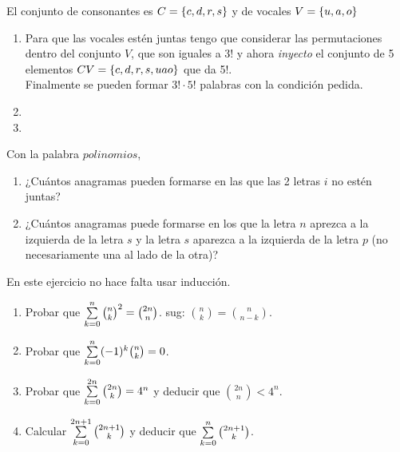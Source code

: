 \documentclass[12pt,a4paper, spanish]{article}
\begin{document}
\separadorCorto

El conjunto de consonantes es $C = \left\{ c,d,r,s \right\}$ y de vocales $V = \left\{ u,a,o \right\}$
\begin{enumerate}[label=\roman*)]
	\item  Para que las vocales estén juntas tengo que considerar las permutaciones dentro del conjunto $V$, que son iguales a 3! y ahora \textit{inyecto} el conjunto de
	      5 elementos $CV = \left\{ c,d,r,s,{uao} \right\}$ que da 5!.\\
	      Finalmente se pueden formar $3! \cdot 5!$ palabras con la condición pedida.

	\item {}

	\item \hacer

\end{enumerate}

\ejercicio

Con la palabra $polinomios$,

\begin{enumerate}[label=\roman*)]
	\item ¿Cuántos anagramas pueden formarse en las que las 2 letras $i$ no estén juntas?
	\item ¿Cuántos anagramas puede formarse en los que la letra $n$ aprezca a la izquierda de la letra $s$ y
	      la letra $s$ aparezca a la izquierda de la letra $p$ (no necesariamente una al lado de la otra)?
\end{enumerate}


\ejercicio

\ejercicio

\ejercicio

\ejercicio

\ejercicio
En este ejercicio no hace falta usar inducción.
\begin{enumerate}[label=\roman*)]
	\item Probar que $\sum\limits_{k = 0}^{n} \binom{n}{k}^2 = \binom{2n}{n}$. \qquad sug: $\binom{n}{k} = \binom{n}{n-k}$.
	\item Probar que $\sum\limits_{k = 0}^{n} (-1)^k \binom{n}{k} = 0$.
	\item Probar que $\sum\limits_{k = 0}^{2n} \binom{2n}{k} = 4^n$ y deducir que $\binom{2n}{n} < 4^n$.
	\item Calcular $\sum\limits_{k = 0}^{2n+1} \binom{2n+1}{k}$ y deducir que $\sum\limits_{k=0}^{n} \binom{2n+1}{k}$.
\end{enumerate}
\end{document}
